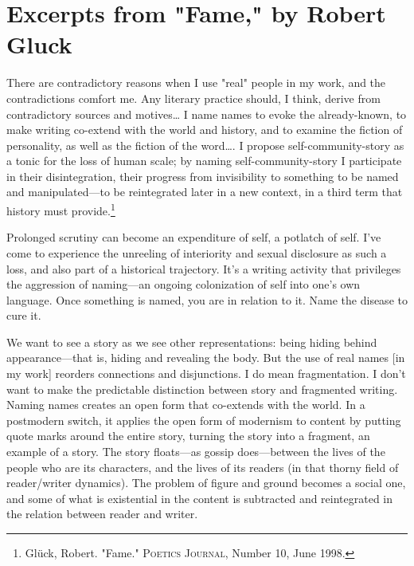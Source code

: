 \documentclass[
]{memoir}
\begin{document}
\hypertarget{excerpts-from-fame-by-robert-gluck}{%
\section*{Excerpts from "Fame," by Robert
Gluck}\label{excerpts-from-fame-by-robert-gluck}}

There are contradictory reasons when I use "real" people in my work, and
the contradictions comfort me. Any literary practice should, I think,
derive from contradictory sources and motives\ldots{} I name names to
evoke the already-known, to make writing co-extend with the world and
history, and to examine the fiction of personality, as well as the
fiction of the word\ldots{}. I propose self-community-story as a tonic
for the loss of human scale; by naming self-community-story I
participate in their disintegration, their progress from invisibility to
something to be named and manipulated---to be reintegrated later in a
new context, in a third term that history must provide.\footnote{Glück,
  Robert. "Fame." \textsc{Poetics Journal}, Number 10, June 1998.}

Prolonged scrutiny can become an expenditure of self, a potlatch of
self. I've come to experience the unreeling of interiority and sexual
disclosure as such a loss, and also part of a historical trajectory.
It's a writing activity that privileges the aggression of naming---an
ongoing colonization of self into one's own language. Once something is
named, you are in relation to it. Name the disease to cure it.

We want to see a story as we see other representations: being hiding
behind appearance---that is, hiding and revealing the body. But the use
of real names {[}in my work{]} reorders connections and disjunctions. I
do mean fragmentation. I don't want to make the predictable distinction
between story and fragmented writing. Naming names creates an open form
that co-extends with the world. In a postmodern switch, it applies the
open form of modernism to content by putting quote marks around the
entire story, turning the story into a fragment, an example of a story.
The story floats---as gossip does---between the lives of the people who
are its characters, and the lives of its readers (in that thorny field
of reader/writer dynamics). The problem of figure and ground becomes a
social one, and some of what is existential in the content is subtracted
and reintegrated in the relation between reader and writer.
\end{document}
